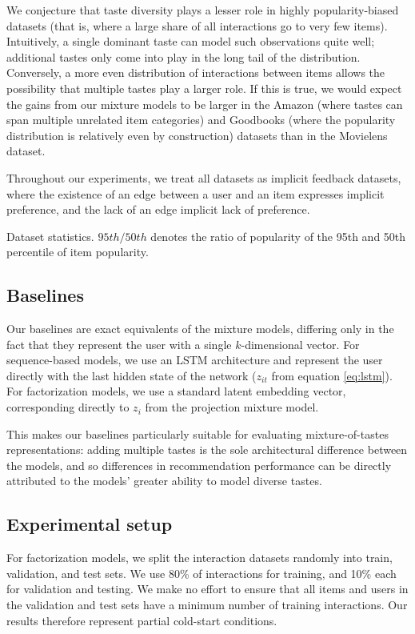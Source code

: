 \documentclass[sigconf]{acmart}
\begin{document}
We conjecture that taste diversity plays a lesser role in highly popularity-biased datasets (that is, where a large share of all interactions go to very few items). Intuitively, a single dominant taste can model such observations quite well; additional tastes only come into play in the long tail of the distribution. Conversely, a more even distribution of interactions between items allows the possibility that multiple tastes play a larger role. If this is true, we would expect the gains from our mixture models to be larger in the Amazon (where tastes can span multiple unrelated item categories) and Goodbooks (where the popularity distribution is relatively even by construction) datasets than in the Movielens dataset.

Throughout our experiments, we treat all datasets as implicit feedback datasets, where the existence of an edge between a user and an item expresses implicit preference, and the lack of an edge implicit lack of preference.

\begin{table}
  \caption{Dataset statistics. $95th/50th$ denotes the ratio of popularity of the 95th and 50th percentile of item popularity.}
  \label{tab:datasets}
  
\end{table}

\subsection{Baselines}
Our baselines are exact equivalents of the mixture models, differing only in the fact that they represent the user with a single $k$-dimensional vector. For sequence-based models, we use an LSTM architecture and represent the user directly with the last hidden state of the network ($z_{it}$ from equation \ref{eq:lstm}). For factorization models, we use a standard latent embedding vector, corresponding directly to $z_i$ from the projection mixture model.

This makes our baselines particularly suitable for evaluating mixture-of-tastes representations: adding multiple tastes is the sole architectural difference between the models, and so differences in recommendation performance can be directly attributed to the models' greater ability to model diverse tastes.

\subsection{Experimental setup}
For factorization models, we split the interaction datasets randomly into train, validation, and test sets. We use 80\% of interactions for training, and 10\% each for validation and testing. We make no effort to ensure that all items and users in the validation and test sets have a minimum number of training interactions. Our results therefore represent partial cold-start conditions.
\end{document}
